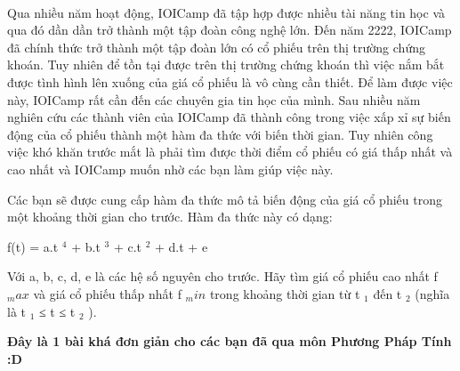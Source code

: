  

Qua nhiều năm hoạt động, IOICamp đã tập hợp được nhiều tài năng tin học và qua đó dần dần trở thành một tập đoàn công nghệ lớn. Đến năm 2222, IOICamp đã chính thức trở thành một tập đoàn lớn có cổ phiếu trên thị trường chứng khoán. Tuy nhiên để tồn tại được trên thị trường chứng khoán thì việc nắm bắt được tình hình lên xuống của giá cổ phiếu là vô cùng cần thiết. Để làm được việc này, IOICamp rất cần đến các chuyên gia tin học của mình. Sau nhiều năm nghiên cứu các thành viên của IOICamp đã thành công trong việc xấp xỉ sự biến động của cổ phiếu thành một hàm đa thức với biến thời gian. Tuy nhiên công việc khó khăn trước mắt là phải tìm được thời điểm cổ phiếu có giá thấp nhất và cao nhất và IOICamp muốn nhờ các bạn làm giúp việc này.

Các bạn sẽ được cung cấp hàm đa thức mô tả biến động của giá cổ phiếu trong một khoảng thời gian cho trước. Hàm đa thức này có dạng:

f(t) = a.t $^ 4 $ + b.t $^ 3 $ + c.t $^ 2 $ + d.t + e

Với a, b, c, d, e là các hệ số nguyên cho trước. Hãy tìm giá cổ phiếu cao nhất f $_ max $ và giá cổ phiếu thấp nhất f $_ min $ trong khoảng thời gian từ t $_ 1 $ đến t $_ 2 $ (nghĩa là t $_ 1 $ ≤ t ≤ t $_ 2 $ ).

\textbf{Đ}\textbf{ây là 1 bài khá đơn giản cho các bạn đã qua môn Phương Pháp Tính :D }

\